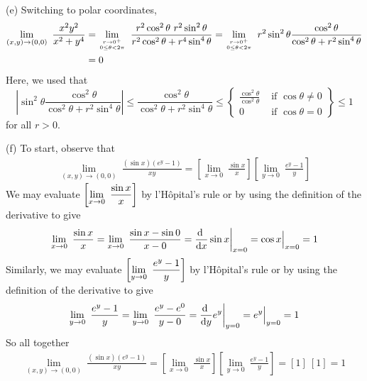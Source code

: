 \begin{solution}
(e) Switching to polar coordinates,
\begin{align*}
    \lim_{(x,y)\rightarrow(0,0)}\ \frac{x^2y^2}{x^2+y^4}
    &=\lim_{\Atop{r\rightarrow0^+}{0\le\theta<2\pi}}\ 
                                \frac{r^2\cos^2\theta\ r^2\sin^2\theta}
                                      {r^2\cos^2\theta+r^4\sin^4\theta}
   =\lim_{\Atop{r\rightarrow0^+}{0\le\theta<2\pi}}\ r^2\sin^2\theta
                  \frac{\cos^2\theta}{\cos^2\theta+r^2\sin^4\theta} \\
   &=  0
\end{align*} 
Here, we used that 
\begin{equation*}
\left|\sin^2\theta\frac{\cos^2\theta} {\cos^2\theta+r^2\sin^4\theta}\right|
\le \frac{\cos^2\theta} {\cos^2\theta+r^2\sin^4\theta}
\le \left.\begin{cases}
             \frac{\cos^2\theta} {\cos^2\theta}&\text{ if }\cos\theta\ne 0 \\
              0 &\text { if }\cos\theta =0
           \end{cases}
     \right\}
\le 1
\end{equation*} 
for all $r>0$.

(f) To start, observe that
\begin{align*}
\lim_{(x,y)\rightarrow (0,0)}\ 
                  \frac{(\sin x)\left(e^y-1\right)}{xy}
          =\left[\lim_{x\rightarrow 0}\ 
                  \frac{\sin x}{x}\right]
            \left[\lim_{y\rightarrow 0}\ 
                  \frac{e^y-1}{y}\right]
\end{align*}
We may evaluate  $\dst\left[\lim_{x\rightarrow 0}\ 
                  \frac{\sin x}{x}\right]$
by l'H\^opital's rule or by using the definition of the derivative to give
\begin{equation*}
\lim_{x\rightarrow 0}\ \frac{\sin x}{x}
=\lim_{x\rightarrow 0}\ \frac{\sin x-\sin 0}{x-0}
=\diff{}{x}\sin x\bigg|_{x=0}
=\cos x\Big|_{x=0}=1
\end{equation*}
Similarly, we may evaluate  $\dst\left[\lim_{y\rightarrow 0}\ 
                  \frac{e^y-1}{y}\right]$
by l'H\^opital's rule or by using the definition of the derivative to give
\begin{equation*}
\lim_{y\rightarrow 0}\ \frac{e^y-1}{y}
=\lim_{y\rightarrow 0}\ \frac{e^y-e^0}{y-0}
=\diff{}{y}e^y\bigg|_{y=0}
=e^y\Big|_{y=0}=1
\end{equation*}
So all together
\begin{align*}
\lim_{(x,y)\rightarrow (0,0)}\ 
                  \frac{(\sin x)\left(e^y-1\right)}{xy}
          =\left[\lim_{x\rightarrow 0}\ 
                  \frac{\sin x}{x}\right]
            \left[\lim_{y\rightarrow 0}\ 
                  \frac{e^y-1}{y}\right]
          =[1]\ [1]=1
\end{align*}
\end{solution}

